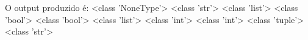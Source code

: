 \documentclass[12pt,varwidth=16cm,border=1pt]{standalone}
\begin{document}
O output produzido é:\newline
<class 'NoneType'>\newline
<class 'str'>\newline
<class 'list'>\newline
<class 'bool'>\newline
<class 'bool'>\newline
<class 'list'>\newline
<class 'int'>\newline
<class 'int'>\newline
<class 'tuple'>\newline
<class 'str'>
\end{document}

